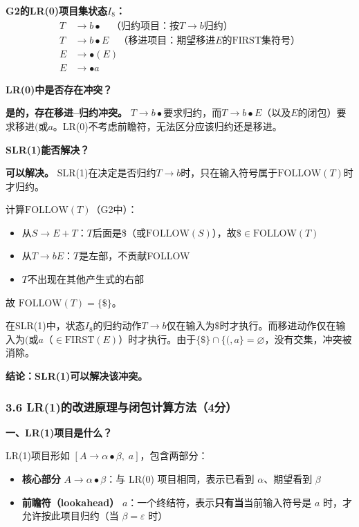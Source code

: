 \documentclass[12pt,a4paper,fontset=fandol]{ctexart}
\begin{document}
\textbf{G2的LR(0)项目集状态$I_8$：}
\[
\begin{aligned}
T &\to b\bullet \quad \text{（归约项目：按}T \to b\text{归约）} \\
T &\to b\bullet E \quad \text{（移进项目：期望移进}E\text{的FIRST集符号）} \\
E &\to \bullet (E) \\
E &\to \bullet a
\end{aligned}
\]

\textbf{LR(0)中是否存在冲突？}

\textbf{是的，存在移进--归约冲突。} $T \to b\bullet$要求归约，而$T \to b\bullet E$（以及$E$的闭包）要求移进$($或$a$。LR(0)不考虑前瞻符，无法区分应该归约还是移进。

\textbf{SLR(1)能否解决？}

\textbf{可以解决。} SLR(1)在决定是否归约$T \to b$时，只在输入符号属于$\text{FOLLOW}(T)$时才归约。

计算$\text{FOLLOW}(T)$（G2中）：
\begin{itemize}
    \item 从$S \to E + T$：$T$后面是\$（或$\text{FOLLOW}(S)$），故$\$ \in \text{FOLLOW}(T)$
    \item 从$T \to bE$：$T$是左部，不贡献FOLLOW
    \item $T$不出现在其他产生式的右部
\end{itemize}
故 $\text{FOLLOW}(T) = \{\$\}$。

在SLR(1)中，状态$I_8$的归约动作$T \to b$仅在输入为$\$ $时才执行。而移进动作仅在输入为$($或$a$（$\in \text{FIRST}(E)$）时才执行。由于$\{\$\} \cap \{(, a\} = \varnothing$，没有交集，冲突被消除。

\textbf{结论：SLR(1)可以解决该冲突。}

\subsubsection*{3.6 LR(1)的改进原理与闭包计算方法（4分）}

\textbf{一、LR(1)项目是什么？}

LR(1)项目形如 $[A \to \alpha \bullet \beta,\; a]$，包含两部分：
\begin{itemize}
    \item \textbf{核心部分} $A \to \alpha \bullet \beta$：与 LR(0) 项目相同，表示已看到 $\alpha$、期望看到 $\beta$
    \item \textbf{前瞻符（lookahead）} $a$：一个终结符，表示\textbf{只有当}当前输入符号是 $a$ 时，才允许按此项目归约（当 $\beta = \varepsilon$ 时）
\end{itemize}
\end{document}
